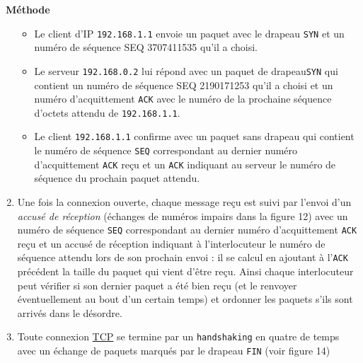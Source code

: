 \documentclass[
  11pt,
]{article}
\newcommand{\passthrough}[1]{#1}
\providecommand{\tightlist}{%
  \setlength{\itemsep}{0pt}\setlength{\parskip}{0pt}}
\newenvironment{methode}[1]
{\par \medskip    \noindent  
 \begin {bclogo}[arrondi =0.1,logo=\bcoutil, marge=4,noborder = true] {~\textbf{Méthode}   {\itshape #1} }  \par}
{
\end{bclogo}
 \par \bigskip }
\begin{document}
\begin{methode}{}
\begin{enumerate}
  \begin{itemize}
  \tightlist
  \item
    Le client d'IP \passthrough{\lstinline!192.168.1.1!} envoie un
    paquet avec le drapeau \passthrough{\lstinline!SYN!} et un numéro de
    séquence SEQ 3707411535 qu'il a choisi.
  \item
    Le serveur \passthrough{\lstinline!192.168.0.2!} lui répond avec un
    paquet de drapeau\passthrough{\lstinline!SYN!} qui contient un
    numéro de séquence SEQ 2190171253 qu'il a choisi et un numéro
    d'acquittement \passthrough{\lstinline!ACK!} avec le numéro de la
    prochaine séquence d'octets attendu de
    \passthrough{\lstinline!192.168.1.1!}.
  \item
    Le client \passthrough{\lstinline!192.168.1.1!} confirme avec un
    paquet sans drapeau qui contient le numéro de séquence
    \passthrough{\lstinline!SEQ!} correspondant au dernier numéro
    d'acquittement \passthrough{\lstinline!ACK!} reçu et un
    \passthrough{\lstinline!ACK!} indiquant au serveur le numéro de
    séquence du prochain paquet attendu.
  \end{itemize}
\item
  Une fois la connexion ouverte, chaque message reçu est suivi par
  l'envoi d'un \emph{accusé de réception} (échanges de numéros impairs
  dans la figure 12) avec un numéro de séquence
  \passthrough{\lstinline!SEQ!} correspondant au dernier numéro
  d'acquittement \passthrough{\lstinline!ACK!} reçu et un accusé de
  réception indiquant à l'interlocuteur le numéro de séquence attendu
  lors de son prochain envoi : il se calcul en ajoutant à
  l'\passthrough{\lstinline!ACK!} précédent la taille du paquet qui
  vient d'être reçu. Ainsi chaque interlocuteur peut vérifier si son
  dernier paquet a été bien reçu (et le renvoyer éventuellement au bout
  d'un certain temps) et ordonner les paquets s'ils sont arrivés dans le
  désordre.
\item
  Toute connexion
  \href{https://fr.wikipedia.org/wiki/Transmission_Control_Protocol}{TCP}
  se termine par un \passthrough{\lstinline!handshaking!} en quatre de
  temps avec un échange de paquets marqués par le drapeau
  \passthrough{\lstinline!FIN!} (voir figure 14)
\end{enumerate}

\end{methode}
\end{document}
